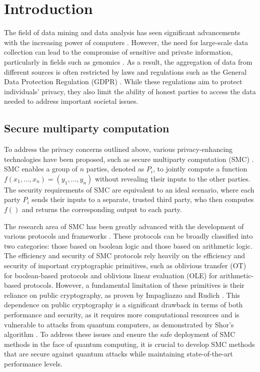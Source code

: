 


%

\chapter{Introduction}

The field of data mining and data analysis has seen significant advancements with the increasing power of computers \cite{Wang11}. However, the need for large-scale data collection can lead to the compromise of sensitive and private information, particularly in fields such as genomics \cite{NS08, L02, Homer08, Gymrek13}. As a result, the aggregation of data from different sources is often restricted by laws and regulations such as the General Data Protection Regulation (GDPR) \cite{EUdataregulations2016}. While these regulations aim to protect individuals' privacy, they also limit the ability of honest parties to access the data needed to address important societal issues.

\section*{Secure multiparty computation}


To address the privacy concerns outlined above, various privacy-enhancing technologies have been proposed, such as secure multiparty computation (SMC) \cite{Li2016, Armknecht2015, Yao82}. SMC enables a group of $n$ parties, denoted as $P_i$, to jointly compute a function $f( x_1, ..., x_n ) = (y_1, ..., y_n)$ without revealing their inputs to the other parties. The security requirements of SMC are equivalent to an ideal scenario, where each party $P_i$ sends their inputs to a separate, trusted third party, who then computes $f()$ and returns the corresponding output to each party.

The research area of SMC has been greatly advanced with the development of various protocols and frameworks \cite{Goldreich87, Bendlin11, D12}. These protocols can be broadly classified into two categories: those based on boolean logic and those based on arithmetic logic. The efficiency and security of SMC protocols rely heavily on the efficiency and security of important cryptographic primitives, such as oblivious transfer (OT) for boolean-based protocols and oblivious linear evaluation (OLE) for arithmetic-based protocols. However, a fundamental limitation of these primitives is their reliance on public cryptography, as proven by Impagliazzo and Rudich \cite{IR99}. This dependence on public cryptography is a significant drawback in terms of both performance and security, as it requires more computational resources and is vulnerable to attacks from quantum computers, as demonstrated by Shor's algorithm \cite{Sho95}. To address these issues and ensure the safe deployment of SMC methods in the face of quantum computing, it is crucial to develop SMC methods that are secure against quantum attacks while maintaining state-of-the-art performance levels.


